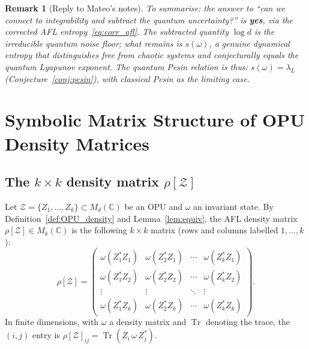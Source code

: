 \documentclass[12pt,a4paper]{article}
\newtheorem{remark}[theorem]{Remark}
\DeclareMathOperator{\Tr}{Tr}
\begin{document}
\begin{remark}[Reply to Mateo's notes]
To summarise: the answer to ``can we connect to integrability and subtract the quantum
uncertainty?'' is \textbf{yes}, via the corrected AFL entropy~\eqref{eq:corr_afl}.
The subtracted quantity $\log d$ is the irreducible quantum noise floor; what remains
is $s(\omega)$, a genuine dynamical entropy that distinguishes free from chaotic systems
and conjecturally equals the quantum Lyapunov exponent.  The quantum Pesin relation is
thus: $s(\omega) = \lambda_L$ (Conjecture~\ref{conj:pesin}), with classical Pesin as the
limiting case.
\end{remark}

\section{Symbolic Matrix Structure of OPU Density Matrices}
\label{sec:matrix_viz}

\subsection{The \texorpdfstring{$k\times k$}{k x k} density matrix \texorpdfstring{$\rho[\mathcal{Z}]$}{rho[Z]}}

Let $\mathcal{Z}=\{Z_1,\ldots,Z_k\}\subset M_d(\mathbb{C})$ be an OPU and
$\omega$ an invariant state.  By Definition~\ref{def:OPU_density} and
Lemma~\ref{lem:equiv}, the AFL density matrix $\rho[\mathcal{Z}]\in M_k(\mathbb{C})$
is the following $k\times k$ matrix (rows and columns labelled $1,\ldots,k$):
\begin{equation}\label{eq:rho1_display}
\rho[\mathcal{Z}]
= \begin{pmatrix}
  \omega(Z_1^*Z_1) & \omega(Z_2^*Z_1) & \cdots & \omega(Z_k^*Z_1) \\
  \omega(Z_1^*Z_2) & \omega(Z_2^*Z_2) & \cdots & \omega(Z_k^*Z_2) \\
  \vdots           & \vdots           & \ddots & \vdots           \\
  \omega(Z_1^*Z_k) & \omega(Z_2^*Z_k) & \cdots & \omega(Z_k^*Z_k)
\end{pmatrix}.
\end{equation}
In finite dimensions, with $\omega$ a density matrix and $\Tr$ denoting the
trace, the $(i,j)$ entry is $\rho[\mathcal{Z}]_{ij}=\Tr(Z_i\,\omega\,Z_j^*)$.
\end{document}
